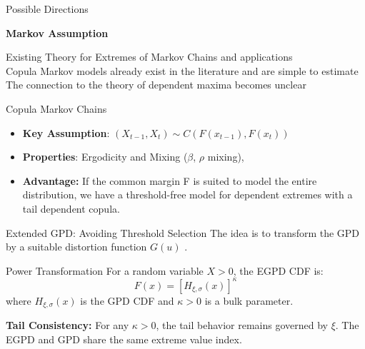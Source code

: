 \documentclass[10pt, aspectratio=169]{beamer}
\begin{document}
\begin{frame}{Possible Directions}
{\begin{minipage}[t]{0.48\textwidth}
\end{minipage}
\hfill
\begin{minipage}[t]{0.48\textwidth}

{\Large \textbf{Markov Assumption}}

\vspace{0.3cm}

\begin{flushleft}
  \textcolor{green!60!black}{\checkmark} Existing Theory for Extremes of Markov Chains and applications \parencite{drees2015, winter2016} \\
   \textcolor{green!60!black}{\checkmark} Copula Markov models already exist in the literature and are simple to estimate \\
   \textcolor{red!70!black}{\texttimes} The connection to the theory of dependent maxima becomes unclear
\end{flushleft}

\end{minipage}
}

\end{frame}

\begin{frame}{Copula Markov Chains}
  \begin{itemize}
    \item \textbf{Key Assumption}: $(X_{t-1}, X_t) \sim C(F(x_{t-1}), F(x_t))$
    \item \textbf{Properties}: Ergodicity and Mixing ($\beta$, $\rho$ mixing), \parencite{chen2009,longla2012}
    \item \textbf{Advantage:} If the common margin F is suited to model the entire distribution, we have a \alert{threshold-free} model for dependent extremes with a \alert{tail dependent} copula.
  \end{itemize}
\end{frame}

\begin{frame}{Extended GPD: Avoiding Threshold Selection}
    The idea is to transform the GPD by a suitable distortion function $G(u)$ \parencite{naveau2016}. \pause

    \begin{block}{Power Transformation}
      \vspace{0.1cm}
        For a random variable $X > 0$, the EGPD CDF is:
        \[
        F(x) = \left[ H_{\xi, \sigma}(x) \right]^\kappa
        \]
        where $H_{\xi, \sigma}(x)$ is the GPD CDF and \alert{$\kappa > 0$} is a bulk parameter.
    \end{block} \pause

    \textbf{Tail Consistency:} For any $\kappa > 0$, the tail behavior remains governed by $\xi$. The EGPD and GPD share the \alert{same extreme value index}.
\end{frame}
\end{document}
